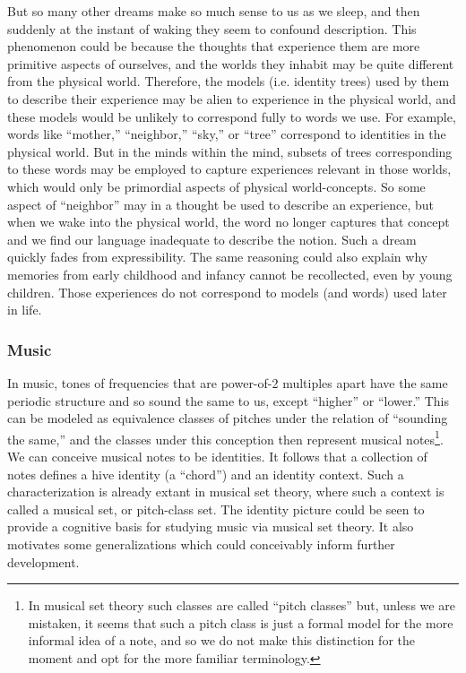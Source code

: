 \documentclass[pra,twocolumn,groupedaddress,10pt]{revtex4}
\theoremstyle{definition}
\begin{document}
But so many other dreams make so much sense to us as we sleep, and then suddenly at the instant of waking they seem to confound description. This phenomenon could be because the thoughts that experience them are more primitive aspects of ourselves, and the worlds they inhabit may be quite different from the physical world. Therefore, the models (i.e. identity trees) used by them to describe their experience may be alien to experience in the physical world, and these models would be unlikely to correspond fully to words we use. For example, words like ``mother,'' ``neighbor,'' ``sky,'' or ``tree'' correspond to identities in the physical world. But in the minds within the mind, subsets of trees corresponding to these words may be employed to capture experiences relevant in those worlds, which would only be primordial aspects of physical world-concepts. So some aspect of ``neighbor'' may in a thought be used to describe an experience, but when we wake into the physical world, the word no longer captures that concept and we find our language inadequate to describe the notion. Such a dream quickly fades from expressibility. The same reasoning could also explain why memories from early childhood and infancy cannot be recollected, even by young children. Those experiences do not correspond to models (and words) used later in life.

\subsubsection{Music} \label{sec:music}

In music, tones of frequencies that are power-of-2 multiples apart have the same periodic structure and so sound the same to us, except ``higher'' or ``lower.'' This can be modeled as equivalence classes of pitches under the relation of ``sounding the same,'' and the classes under this conception then represent musical notes\footnote{In musical set theory such classes are called ``pitch classes'' but, unless we are mistaken, it seems that such a pitch class is just a formal model for the more informal idea of a note, and so we do not make this distinction for the moment and opt for the more familiar terminology.}. We can conceive musical notes to be identities. It follows that a collection of notes defines a hive identity (a ``chord'') and an identity context. Such a characterization is already extant in musical set theory\cite{musicalsettheory}, where such a context is called a musical set, or pitch-class set. The identity picture could be seen to provide a cognitive basis for studying music via musical set theory. It also motivates some generalizations which could conceivably inform further development.
\end{document}
